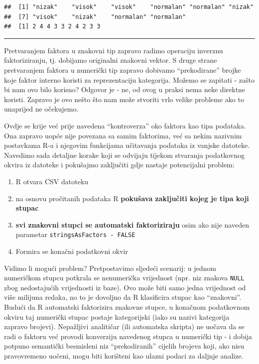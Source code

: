 \documentclass[]{book}
\providecommand{\tightlist}{%
  \setlength{\itemsep}{0pt}\setlength{\parskip}{0pt}}
\theoremstyle{definition}
\theoremstyle{definition}
\theoremstyle{definition}
\theoremstyle{remark}
\begin{document}
\begin{verbatim}
##  [1] "nizak"    "visok"    "visok"    "normalan" "normalan" "nizak"   
##  [7] "visok"    "nizak"    "normalan" "normalan"
##  [1] 2 4 4 3 3 2 4 2 3 3
\end{verbatim}

\begin{center}\rule{0.5\linewidth}{\linethickness}\end{center}

Pretvaranjem faktora u znakovni tip zapravo radimo operaciju inverznu
faktoriziranju, tj. dobijamo originalni znakovni vektor. S druge strane
pretvaranjem faktora u numerički tip zapravo dobivamo ``prekodirane''
brojke koje faktor interno koristi za reprezentaciju kategorija. Možemo
se zapitati - zašto bi nam ovo bilo korisno? Odgovor je - ne, od ovog u
praksi nema neke direktne koristi. Zapravo je ovo nešto što nam može
stvoriti vrlo velike probleme ako to unaprijed ne očekujemo.

Ovdje se krije već prije navedena ``kontroverza'' oko faktora kao tipa
podataka. Ona zapravo uopće nije povezana sa samim faktorima, već sa
nekim nazivnim postavkama R-a i njegovim funkcijama učitavanja podataka
iz vanjske datoteke. Navedimo sada detaljne korake koji se odvijaju
tijekom stvaranja podatkovnog okvira iz datoteke i pokušajmo zaključiti
gdje nastaje potencijalni problem:

\begin{enumerate}
\def\labelenumi{\arabic{enumi}.}
\tightlist
\item
  R otvara CSV datoteku
\item
  na osnovu pročitanih podataka R \textbf{pokušava zaključiti kojeg je
  tipa koji stupac}
\item
  \textbf{svi znakovni stupci se automatski faktoriziraju} osim ako nije
  naveden parametar \texttt{stringsAsFactors\ -\ FALSE}
\item
  Formira se konačni podatkovni okvir
\end{enumerate}

Vidimo li mogući problem? Pretpostavimo sljedeći scenarij: u jednom
numeričkom stupcu potkrala se nenumerička vrijednost (npr. niz znakova
\texttt{NULL} zbog nedostajućih vrijednosti iz baze). Ovo može biti samo
jedna vrijednost od više milijuna redaka, no to je dovoljno da R
klasificira stupac kao ``znakovni''. Budući da R automatski faktorizira
znakovne stupce, u konačnom podatkovnom okviru taj numerički stupac
postaje kategorijski (iako su nazivi kategorija zapravo brojevi).
Nepažljivi analitičar (ili automatska skripta) ne uočava da se radi o
faktoru već provodi konverziju navedenog stupca u numerički tip - i
dobija potpuno semantički besmisleni niz ``prekodiranih'' cijelih
brojeva koji, ako nisu pravovremeno uočeni, mogu biti korišteni kao
ulazni podaci za daljnje analize.
\end{document}

